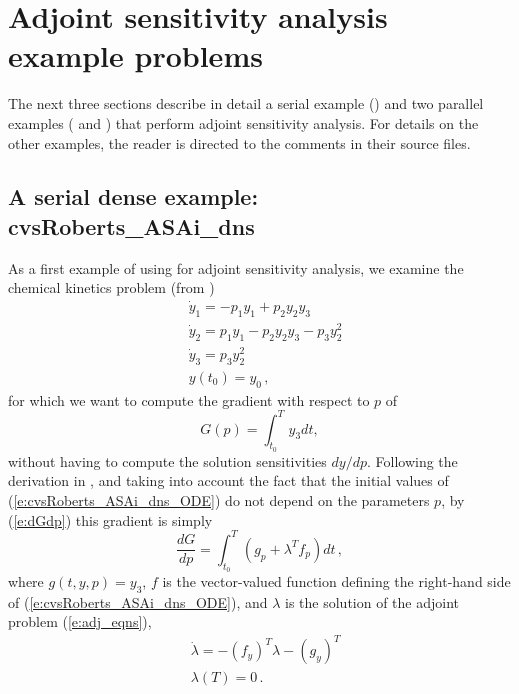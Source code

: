 \section{Adjoint sensitivity analysis example problems}\label{s:adj_examples}

The next three sections describe in detail a serial example
() and two parallel examples
( and )
that perform adjoint sensitivity analysis.  For details on the other
examples, the reader is directed to the comments in their source files.

\subsection{A serial dense example: cvsRoberts\_ASAi\_dns}\label{ss:cvsRoberts_ASAi_dns}

As a first example of using {\cvodes} for adjoint sensitivity analysis,
we examine the chemical kinetics problem (from ) 
\begin{equation}\label{e:cvsRoberts_ASAi_dns_ODE}
  \begin{split}
    &{\dot y}_1 = -p_1 y_1 + p_2 y_2 y_3   \\
    &{\dot y}_2 =  p_1 y_1 - p_2 y_2 y_3 - p_3 y_2^2 \\
    &{\dot y}_3 =  p_3 y_2^2 \\
    &y(t_0) = y_0 \, ,
  \end{split}
\end{equation}
for which we want to compute the gradient with respect to $p$ of 
\begin{equation}\label{e:cvsRoberts_ASAi_dns_G}
  G(p) = \int_{t_0}^{T}  y_3  dt ,
\end{equation}
without having to compute the solution sensitivities ${dy}/{dp}$.
Following the derivation in , and taking into account
the fact that the initial values of (\ref{e:cvsRoberts_ASAi_dns_ODE}) do not depend on 
the parameters $p$, by (\ref{e:dGdp}) this gradient is simply
\begin{equation}\label{e:cvsRoberts_ASAi_dns_dGdp}
\frac{dG}{dp} = \int_{t_0}^{T} 
\left( g_p + \lambda^T f_p \right) dt \, ,
\end{equation}
where $g(t,y,p) = y_3$, $f$ is the vector-valued function 
defining the right-hand side of (\ref{e:cvsRoberts_ASAi_dns_ODE}), and $\lambda$ is 
the solution of the adjoint problem (\ref{e:adj_eqns}),
\begin{equation}\label{e:cvsRoberts_ASAi_dns_ADJ}
  \begin{split}
    &{\dot\lambda} = - (f_y)^T  \lambda - (g_y)^T \\
    &\lambda(T) = 0 \, .
  \end{split}
\end{equation}

